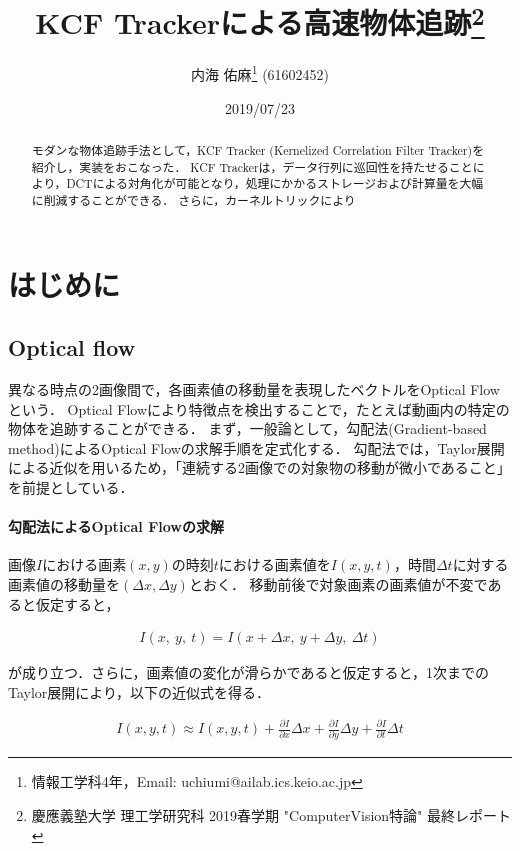 \documentclass[11pt,a4j]{jarticle}
\title{{KCF Trackerによる高速物体追跡}\thanks{慶應義塾大学 理工学研究科 2019春学期 "ComputerVision特論" 最終レポート} \\ }
\author{内海 佑麻\thanks{情報工学科4年，Email: uchiumi@ailab.ics.keio.ac.jp} (61602452)}
\date{2019/07/23}
\begin{document}
  \maketitle
  \begin{abstract}
    モダンな物体追跡手法として，KCF Tracker (Kernelized Correlation Filter Tracker)を紹介し，実装をおこなった．\cite{DBLP:journals/corr/HenriquesCMB14}
    KCF Trackerは，データ行列に巡回性を持たせることにより，DCTによる対角化が可能となり，処理にかかるストレージおよび計算量を大幅に削減することができる．
    さらに，カーネルトリックにより

  \end{abstract}
  \tableofcontents
  \section{はじめに}

    \subsection{Optical flow}
      異なる時点の2画像間で，各画素値の移動量を表現したベクトルをOptical Flowという．
      Optical Flowにより特徴点を検出することで，たとえば動画内の特定の物体を追跡することができる．
      まず，一般論として，勾配法(Gradient-based method)によるOptical Flowの求解手順を定式化する．
      勾配法では，Taylor展開による近似を用いるため，「連続する2画像での対象物の移動が微小であること」を前提としている．

      \paragraph{勾配法によるOptical Flowの求解}
      画像$I$における画素$(x,y)$の時刻$t$における画素値を$I(x,y,t)$，時間$\Delta t$に対する画素値の移動量を$(\Delta x, \Delta y)$とおく．
      移動前後で対象画素の画素値が不変であると仮定すると，

      \begin{align}
        I(x, ~ y, ~ t) = I(x + \Delta x, ~ y + \Delta y, ~ \Delta t)
      \end{align}

      が成り立つ．さらに，画素値の変化が滑らかであると仮定すると，1次までのTaylor展開により，以下の近似式を得る．

      \begin{align}
        I(x,y,t) \approx I(x,y,t) + \frac{\partial I}{\partial x} \Delta x + \frac{\partial I}{\partial y} \Delta y + \frac{\partial I}{\partial t} \Delta t
      \end{align}
\end{document}
